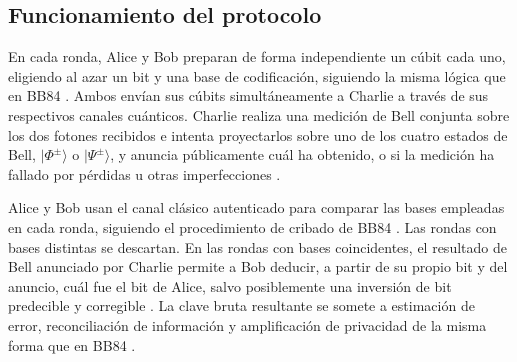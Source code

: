 \subsection{Funcionamiento del protocolo}
 
En cada ronda, Alice y Bob preparan de forma independiente un cúbit cada uno, eligiendo al azar un bit y una base de codificación, siguiendo la misma lógica que en BB84 \citep{bennett1984,lo2012}. Ambos envían sus cúbits simultáneamente a Charlie a través de sus respectivos canales cuánticos. Charlie realiza una medición de Bell conjunta sobre los dos fotones recibidos e intenta proyectarlos sobre uno de los cuatro estados de Bell, $|\Phi^\pm\rangle$ o $|\Psi^\pm\rangle$, y anuncia públicamente cuál ha obtenido, o si la medición ha fallado por pérdidas u otras imperfecciones \citep{lo2012,braunstein2012}.
 
Alice y Bob usan el canal clásico autenticado para comparar las bases empleadas en cada ronda, siguiendo el procedimiento de cribado de BB84 \citep{bennett1984}. Las rondas con bases distintas se descartan. En las rondas con bases coincidentes, el resultado de Bell anunciado por Charlie permite a Bob deducir, a partir de su propio bit y del anuncio, cuál fue el bit de Alice, salvo posiblemente una inversión de bit predecible y corregible \citep{lo2012,curty2014}. La clave bruta resultante se somete a estimación de error, reconciliación de información y amplificación de privacidad de la misma forma que en BB84 \citep{brassard1994,bennett1995,scarani2009}.
 
